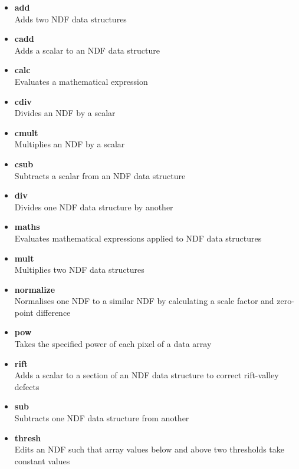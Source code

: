 \documentclass[twoside,11pt]{article}
\newcommand{\xref}[3]{#1}
\begin{document}
\begin{\htmlonly}
{\begin{itemize}

\item{\xref{{\bf add}}{sun95}{ADD}}\\
Adds two NDF data structures 
\item{\xref{{\bf cadd}}{sun95}{CADD}}\\
Adds a scalar to an NDF data structure 
\item{\xref{{\bf calc}}{sun95}{CALC}}\\
Evaluates a mathematical expression  
\item{\xref{{\bf cdiv}}{sun95}{CDIV}}\\
Divides an NDF by a scalar 
\item{\xref{{\bf cmult}}{sun95}{CMULT}}\\
Multiplies an NDF by a scalar 
\item{\xref{{\bf csub}}{sun95}{CSUB}}\\
Subtracts a scalar from an NDF data structure 
\item{\xref{{\bf div}}{sun95}{DIV}}\\
Divides one NDF data structure by another
\item{\xref{{\bf maths}}{sun95}{MATHS}}\\
Evaluates mathematical expressions applied to NDF data structures 
\item{\xref{{\bf mult}}{sun95}{MULT}}\\
Multiplies two NDF data structures 
\item{\xref{{\bf normalize}}{sun95}{NORMALIZE}}\\
Normalises one NDF to a similar NDF by calculating a scale factor and zero-point difference 
\item{\xref{{\bf pow}}{sun95}{POW}}\\ 
Takes the specified power of each pixel of a data array 
\item{\xref{{\bf rift}}{sun95}{RIFT}}\\ 
Adds a scalar to a section of an NDF data structure to correct rift-valley defects 
\item{\xref{{\bf sub}}{sun95}{SUB}}\\
Subtracts one NDF data structure from another 
\item{\xref{{\bf thresh}}{sun95}{THRESH}}\\ 
Edits an NDF such that array values below and above two thresholds take constant values 
\end{itemize}

}
\end{\htmlonly}
\end{document}

